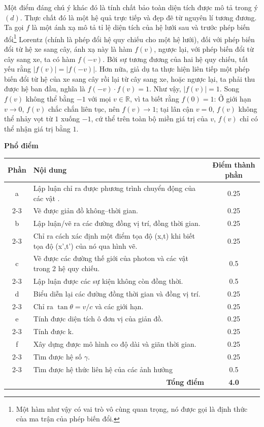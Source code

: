 Một điểm đáng chú ý khác đó là tính chất bảo toàn diện tích được mô tả trong ý $(d)$. Thực chất đó là một hệ quả trực tiếp và đẹp đẽ từ nguyên lí tương đương. Ta gọi $f$ là một ánh xạ mô tả tỉ lệ diện tích của hệ lưới sau và trước phép biến đổi\footnote{Một hàm như vậy có vai trò vô cùng quan trọng, nó được gọi là định thức của ma trận của phép biến đổi.} Lorentz (chính là phép đổi hệ quy chiếu cho một hệ lưới), đối với phép biến đổi từ hệ xe sang cây, ánh xạ này là hàm $f(v)$, ngược lại, với phép biến đổi từ cây sang xe, ta có hàm $f(-v)$. Bởi sự tương đương của hai hệ quy chiếu,  tất yếu rằng $\lvert f(v)\rvert=\lvert f(-v)\rvert$. Hơn nữa, giả dụ ta thực hiện liên tiếp một phép biến đổi từ hệ của xe sang cây rồi lại từ cây sang xe, hoặc ngược lại, ta phải thu được hệ ban đầu, nghĩa là $f(-v)\cdot f(v)=1$. Như vậy, $\lvert f(v)\rvert  =1$.  Song $f(v)$ không thể bằng $-1$ với mọi $v\in\mathbb{R}$, vì ta biết rằng $f(0)=1$: Ở giới hạn $v\to 0$, $f(v)$ chắc chắn liên tục, nên $f(v)\to 1$; tại lân cận $v=0$, $f(v)$ không thể nhảy vọt từ $1$ xuống $-1$, cứ thể trên toàn bộ miền giá trị của $v$, $f(v)$ chỉ có thể nhận giá trị bằng $1$. 

\vspace{0.5 cm}

\noindent \textbf{\large Phổ điểm}
\begin{center}
\renewcommand{\arraystretch}{1.5}
\begin{tabularx}{\textwidth}{|c|X|c|}
\hline
\textbf{Phần} & \textbf{Nội dung} & \textbf{Điểm thành phần} \\ \hline
a &Lập luận chỉ ra được phương trình chuyển động của các vật . & 0.25 \\ \cline{2-3} 
 & Vẽ được giản đồ không--thời gian. & 0.25 \\ \hline
b &Lập luận/vẽ ra các đường đồng vị trí, đồng thời gian. & 0.25 \\ \cline{2-3} 
 &Chỉ ra cách xác định một điểm tọa độ (x,t) khi biết tọa độ (x',t') của nó qua hình vẽ. & 0.25 \\ \hline
c &Vẽ được các đường thế giới của photon và các vật trong 2 hệ quy chiếu. & 0.5 \\ \cline{2-3} 
 &Lập luận được các sự kiện không còn đồng thời. & 0.5 \\ \hline
d &Biểu diễn lại các đường đồng thời gian và đồng vị trí. & 0.25 \\ \cline{2-3} 
 &Chỉ ra $\tan \theta = v/c$ và các giới hạn. & 0.25 \\ \hline
e &Tính được diện tích ô đơn vị của giản đồ. & 0.25 \\ \cline{2-3} 
 & Tính được k. & 0.25 \\ \hline
f &Xây dựng được mô hình co độ dài và giãn thời gian. & 0.25 \\ \cline{2-3} 
 &Tìm được hệ số $\gamma$. & 0.25 \\ \cline{2-3} 
& Tìm được hệ thức liên hệ của các ảnh hưởng & 0.5 \\ \hline
\multicolumn{2}{|r|}{\textbf{Tổng điểm}} & \textbf{4.0} \\ \hline
\end{tabularx}
\end{center}